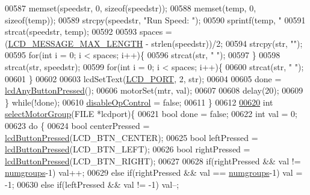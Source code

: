 \begin{DoxyCode}
{{{{{{{{{00587         memset(speedstr, 0, \textcolor{keyword}{sizeof}(speedstr));
00588         memset(temp, 0, \textcolor{keyword}{sizeof}(temp));
00589         strcpy(speedstr, \textcolor{stringliteral}{"Run Speed: "});
00590         sprintf(temp, \textcolor{stringliteral}{"%
00591         strcat(speedstr, temp);
00592 
00593         spaces = (\hyperlink{lcdmsg_8h_abe4c4b70fc6f44ae3680e5b2c68cdd00}{LCD\_MESSAGE\_MAX\_LENGTH} - strlen(speedstr))/2;
00594         strcpy(str, \textcolor{stringliteral}{""});
00595         \textcolor{keywordflow}{for}(\textcolor{keywordtype}{int} i = 0; i < spaces; i++)\{
00596             strcat(str, \textcolor{stringliteral}{" "});
00597         \}
00598         strcat(str, speedstr);
00599         \textcolor{keywordflow}{for}(\textcolor{keywordtype}{int} i = 0; i < spaces; i++)\{
00600             strcat(str, \textcolor{stringliteral}{" "});
00601         \}
00602 
00603         lcdSetText(\hyperlink{lcdmsg_8h_abcf42bd88b3c36193f301ca25b033875}{LCD\_PORT}, 2, str);
00604 
00605         done = \hyperlink{lcddiag_8h_a0592813f995bfeeadb9bee923833ed35}{lcdAnyButtonPressed}();
00606         motorSet(mtr, val);
00607 
00608         delay(20);
00609     \} \textcolor{keywordflow}{while}(!done);
00610     \hyperlink{lcddiag_8c_a0f0b335cd078d025d6fb720eb3bf6437}{disableOpControl} = \textcolor{keyword}{false};
00611 \}
00612 
\hypertarget{lcddiag_8c_source.tex_l00620}{}\hyperlink{lcddiag_8c_a45205137e2aea6d387568cabe3072002}{00620} \textcolor{keywordtype}{int} \hyperlink{lcddiag_8c_a45205137e2aea6d387568cabe3072002}{selectMotorGroup}(FILE *lcdport)\{
00621     \textcolor{keywordtype}{bool} done = \textcolor{keyword}{false};
00622     \textcolor{keywordtype}{int} val = 0;
00623     \textcolor{keywordflow}{do} \{
00624         \textcolor{keywordtype}{bool} centerPressed = \hyperlink{lcddiag_8h_a74e4c744db49f9b7b645095575e152ad}{lcdButtonPressed}(LCD\_BTN\_CENTER);
00625         \textcolor{keywordtype}{bool} leftPressed = \hyperlink{lcddiag_8h_a74e4c744db49f9b7b645095575e152ad}{lcdButtonPressed}(LCD\_BTN\_LEFT);
00626         \textcolor{keywordtype}{bool} rightPressed = \hyperlink{lcddiag_8h_a74e4c744db49f9b7b645095575e152ad}{lcdButtonPressed}(LCD\_BTN\_RIGHT);
00627 
00628         \textcolor{keywordflow}{if}(rightPressed && val != \hyperlink{lcddiag_8c_a205f1cedec1664555276e0a71a1c87d8}{numgroups}-1) val++;
00629         \textcolor{keywordflow}{else} \textcolor{keywordflow}{if}(rightPressed && val == \hyperlink{lcddiag_8c_a205f1cedec1664555276e0a71a1c87d8}{numgroups}-1) val = -1;
00630         \textcolor{keywordflow}{else} \textcolor{keywordflow}{if}(leftPressed && val != -1) val--;
}}}}}}}}}}
\end{DoxyCode}
